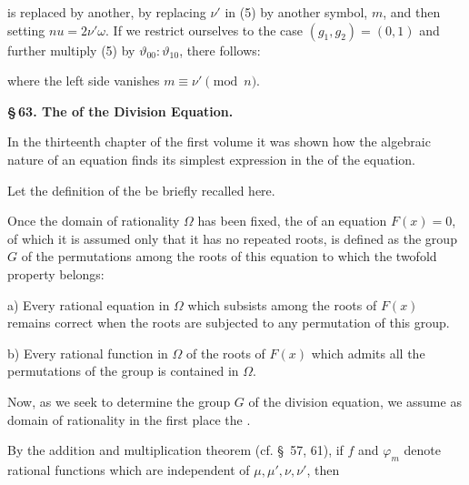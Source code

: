 is replaced by another, by replacing $\nu'$ in (5) by another symbol, $m$, and then setting $nu = 2\nu'\omega$. If we restrict ourselves to the case $(g_1, g_2) = (0, 1)$ and further multiply (5) by $\vartheta_{00} : \vartheta_{10}$, there follows:


where the left side vanishes  $m \equiv \nu' \pmod{n}$.

\medskip

\begin{center}
\textbf{\S\,63. The  of the Division Equation.}
\end{center}

In the thirteenth chapter of the first volume it was shown how the algebraic nature of an equation finds its simplest expression in the  of the equation.

Let the definition of the  be briefly recalled here.

Once the domain of rationality $\Omega$ has been fixed, the  of an equation $F(x) = 0$, of which it is assumed only that it has no repeated roots, is defined as the group $G$ of the permutations among the roots of this equation to which the twofold property belongs:

a) Every rational equation in $\Omega$ which subsists among the roots of $F(x)$ remains correct when the roots are subjected to any permutation of this group.

b) Every rational function in $\Omega$ of the roots of $F(x)$ which admits all the permutations of the group is contained in $\Omega$.

Now, as we seek to determine the group $G$ of the division equation, we assume as domain of rationality in the first place the .

By the addition and multiplication theorem (cf. \S\, 57, 61), if $f$ and $\varphi_m$ denote rational functions which are independent of $\mu, \mu', \nu, \nu'$, then %



